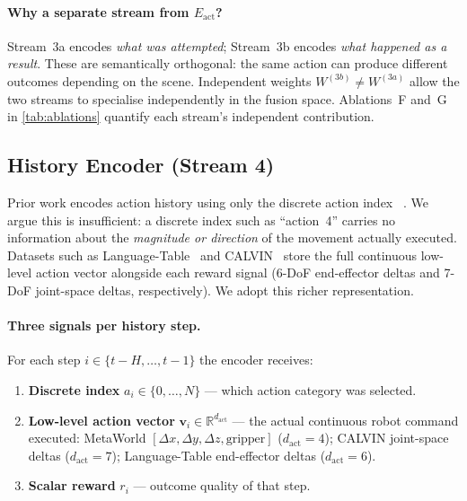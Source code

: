 \documentclass{article}
\newcommand{\Lact}{$E_{\mathrm{act}}$\xspace}   %
\begin{document}
\paragraph{Why a separate stream from \Lact?}
Stream~3a encodes \emph{what was attempted}; Stream~3b encodes
\emph{what happened as a result}.
These are semantically orthogonal: the same action can produce different
outcomes depending on the scene.
Independent weights $W^{(3b)}\neq W^{(3a)}$ allow the two streams to
specialise independently in the fusion space.
Ablations~F and~G in \cref{tab:ablations} quantify each stream's
independent contribution.

\subsection{History Encoder (Stream 4)}

Prior work encodes action history using only the discrete action index
~\citep{chen2021decision, reed2022gato}.
We argue this is insufficient: a discrete index such as ``action~4'' carries no
information about the \emph{magnitude or direction} of the movement actually
executed.
Datasets such as Language-Table~\citep{lynch2023languagetable} and
CALVIN~\citep{mees2022calvin} store the full continuous low-level action
vector alongside each reward signal (6-DoF end-effector deltas and
7-DoF joint-space deltas, respectively).
We adopt this richer representation.

\paragraph{Three signals per history step.}
For each step $i\in\{t{-}H,\ldots,t{-}1\}$ the encoder receives:

\begin{enumerate}[leftmargin=1.5em,itemsep=1pt]
  \item \textbf{Discrete index} $a_i \in \{0,\ldots,N\}$ — which action
    category was selected.
  \item \textbf{Low-level action vector}
    $\mathbf{v}_i \in \mathbb{R}^{d_{\mathrm{act}}}$ — the actual continuous
    robot command executed:
    MetaWorld $[\Delta x,\Delta y,\Delta z,\text{gripper}]$ ($d_{\mathrm{act}}{=}4$);
    CALVIN joint-space deltas ($d_{\mathrm{act}}{=}7$);
    Language-Table end-effector deltas ($d_{\mathrm{act}}{=}6$).
  \item \textbf{Scalar reward} $r_i$ — outcome quality of that step.
\end{enumerate}
\end{document}
